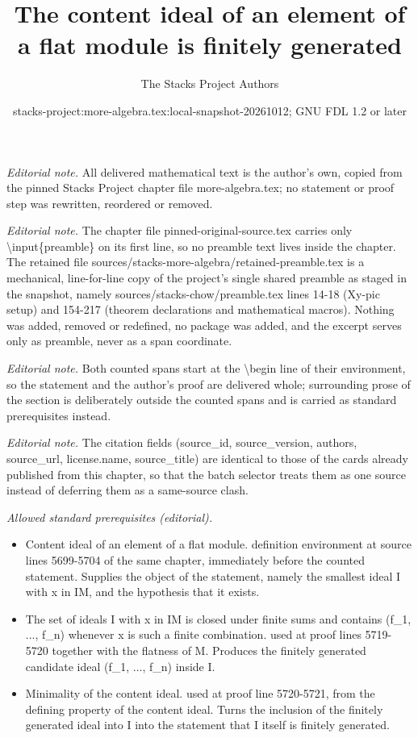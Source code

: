 \documentclass[10pt,a4paper]{amsart}
\title{The content ideal of an element of a flat module is finitely generated}
\author{The Stacks Project Authors}
\date{stacks-project:more-algebra.tex:local-snapshot-20261012; GNU FDL 1.2 or later}
\theoremstyle{plain}
\theoremstyle{definition}
\theoremstyle{remark}
\numberwithin{equation}{subsection}
\begin{document}
\maketitle
\setcounter{subsection}{1}
\noindent\textit{Editorial note.} All delivered mathematical text is the author's own, copied from the pinned Stacks Project chapter file more-algebra.tex; no statement or proof step was rewritten, reordered or removed.\par\medskip
\noindent\textit{Editorial note.} The chapter file pinned-original-source.tex carries only \textbackslash{}input\{preamble\} on its first line, so no preamble text lives inside the chapter. The retained file sources/stacks-more-algebra/retained-preamble.tex is a mechanical, line-for-line copy of the project's single shared preamble as staged in the snapshot, namely sources/stacks-chow/preamble.tex lines 14-18 (Xy-pic setup) and 154-217 (theorem declarations and mathematical macros). Nothing was added, removed or redefined, no package was added, and the excerpt serves only as preamble, never as a span coordinate.\par\medskip
\noindent\textit{Editorial note.} Both counted spans start at the \textbackslash{}begin line of their environment, so the statement and the author's proof are delivered whole; surrounding prose of the section is deliberately outside the counted spans and is carried as standard prerequisites instead.\par\medskip
\noindent\textit{Editorial note.} The citation fields (source\_id, source\_version, authors, source\_url, license.name, source\_title) are identical to those of the cards already published from this chapter, so that the batch selector treats them as one source instead of deferring them as a same-source clash.\par\medskip
\noindent\textit{Allowed standard prerequisites (editorial).}\begin{itemize}
\item Content ideal of an element of a flat module. definition environment at source lines 5699-5704 of the same chapter, immediately before the counted statement. Supplies the object of the statement, namely the smallest ideal I with x in IM, and the hypothesis that it exists.
\item The set of ideals I with x in IM is closed under finite sums and contains (f\_1, ..., f\_n) whenever x is such a finite combination. used at proof lines 5719-5720 together with the flatness of M. Produces the finitely generated candidate ideal (f\_1, ..., f\_n) inside I.
\item Minimality of the content ideal. used at proof line 5720-5721, from the defining property of the content ideal. Turns the inclusion of the finitely generated ideal into I into the statement that I itself is finitely generated.
\end{itemize}\medskip
\end{document}

